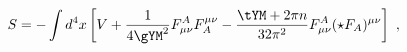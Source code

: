 \begin{equation}
\label{D5action_exp}
  S = - \int d^4x \left[ V + \frac1{4\gYM^2} F^A_{\mu\nu} F_A^{\mu\nu} 
  -\frac{\tYM+2\pi n}{32\pi^2}  F^A_{\mu\nu} (\star F_A)^{\mu\nu} \right]~,
\end{equation}

